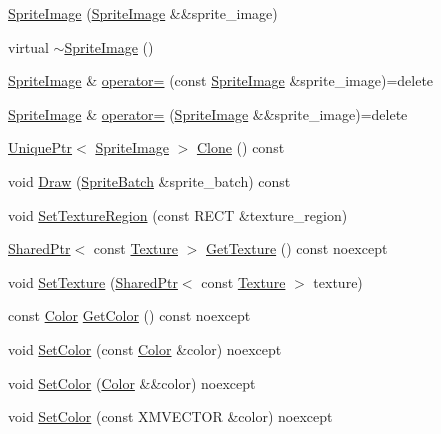 \begin{DoxyCompactItemize}
\item 
\hyperlink{classmage_1_1_sprite_image_ae1ea5c900498c8ecdf5dd3131d056dd5}{Sprite\+Image} (\hyperlink{classmage_1_1_sprite_image}{Sprite\+Image} \&\&sprite\+\_\+image)
\item 
virtual \hyperlink{classmage_1_1_sprite_image_a9121ee110f7e64ee6e936e0d3350ab44}{$\sim$\+Sprite\+Image} ()
\item 
\hyperlink{classmage_1_1_sprite_image}{Sprite\+Image} \& \hyperlink{classmage_1_1_sprite_image_a20d8e8272cf62599f6c0e4b1ff4f3586}{operator=} (const \hyperlink{classmage_1_1_sprite_image}{Sprite\+Image} \&sprite\+\_\+image)=delete
\item 
\hyperlink{classmage_1_1_sprite_image}{Sprite\+Image} \& \hyperlink{classmage_1_1_sprite_image_a9f83e728a93550f6b20bb4d500483171}{operator=} (\hyperlink{classmage_1_1_sprite_image}{Sprite\+Image} \&\&sprite\+\_\+image)=delete
\item 
\hyperlink{namespacemage_a3316d7143a973e37adf1110f2e80ca31}{Unique\+Ptr}$<$ \hyperlink{classmage_1_1_sprite_image}{Sprite\+Image} $>$ \hyperlink{classmage_1_1_sprite_image_a19db9a2a418dd04db0b38d1f8aa7e035}{Clone} () const
\item 
void \hyperlink{classmage_1_1_sprite_image_ae30d3293931f674fea17008063755bb6}{Draw} (\hyperlink{classmage_1_1_sprite_batch}{Sprite\+Batch} \&sprite\+\_\+batch) const
\item 
void \hyperlink{classmage_1_1_sprite_image_a99640fe6fc85d704f6a2831d0f663033}{Set\+Texture\+Region} (const R\+E\+CT \&texture\+\_\+region)
\item 
\hyperlink{namespacemage_a1e01ae66713838a7a67d30e44c67703e}{Shared\+Ptr}$<$ const \hyperlink{classmage_1_1_texture}{Texture} $>$ \hyperlink{classmage_1_1_sprite_image_a3c88344f40a588d9bd2ecfc922ab9ac4}{Get\+Texture} () const noexcept
\item 
void \hyperlink{classmage_1_1_sprite_image_a9eda532d70317f066cea233445241be1}{Set\+Texture} (\hyperlink{namespacemage_a1e01ae66713838a7a67d30e44c67703e}{Shared\+Ptr}$<$ const \hyperlink{classmage_1_1_texture}{Texture} $>$ texture)
\item 
const \hyperlink{structmage_1_1_color}{Color} \hyperlink{classmage_1_1_sprite_image_aa04711b85cbe98493edd8767ac3348b5}{Get\+Color} () const noexcept
\item 
void \hyperlink{classmage_1_1_sprite_image_ac061b1e201e24097d4b667b8fb53c232}{Set\+Color} (const \hyperlink{structmage_1_1_color}{Color} \&color) noexcept
\item 
void \hyperlink{classmage_1_1_sprite_image_a27b191565b90ee8fe78b7db3be0c9bb2}{Set\+Color} (\hyperlink{structmage_1_1_color}{Color} \&\&color) noexcept
\item 
void \hyperlink{classmage_1_1_sprite_image_a4ee2d13c618ef1c16e4cee8433f3d5dd}{Set\+Color} (const X\+M\+V\+E\+C\+T\+OR \&color) noexcept
\end{DoxyCompactItemize}
